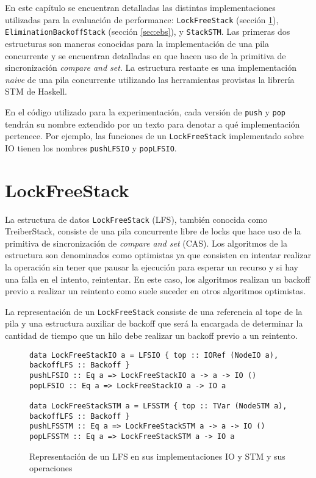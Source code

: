 En este capítulo se encuentran detalladas las distintas implementaciones utilizadas para la evaluación de performance: \texttt{LockFreeStack} (sección \ref{sec:lfs}), \texttt{EliminationBackoffStack} (sección \ref{sec:ebs}), y \texttt{StackSTM}. Las primeras dos estructuras son maneras conocidas para la implementación de una pila concurrente y se encuentran detalladas en \cite{shavit} que hacen uso de la primitiva de sincronización \emph{compare and set}. La estructura restante es una implementación \emph{naive} de una pila concurrente utilizando las herramientas provistas la librería STM de Haskell.

En el código utilizado para la experimentación, cada versión de \texttt{push} y \texttt{pop} tendrán su nombre extendido por un texto para denotar a qué implementación pertenece. Por ejemplo, las funciones de un \texttt{LockFreeStack} implementado sobre IO tienen los nombres \texttt{pushLFSIO} y \texttt{popLFSIO}.

\clearpage
\section{LockFreeStack}\label{sec:lfs}
La estructura de datos \texttt{LockFreeStack} (LFS), también conocida como TreiberStack, consiste de una pila concurrente libre de locks que hace uso de la primitiva de sincronización de \emph{compare and set} (CAS). Los algoritmos de la estructura son denominados como optimistas ya que consisten en intentar realizar la operación sin tener que pausar la ejecución para esperar un recurso y si hay una falla en el intento, reintentar. En este caso, los algoritmos realizan un backoff previo a realizar un reintento como suele suceder en otros algoritmos optimistas.

La representación de un \texttt{LockFreeStack} consiste de una referencia al tope de la pila y una estructura auxiliar de backoff que será la encargada de determinar la cantidad de tiempo que un hilo debe realizar un backoff previo a un reintento.

\begin{figure}[H]
  \centering
  \begin{verbatim}
data LockFreeStackIO a = LFSIO { top :: IORef (NodeIO a), backoffLFS :: Backoff }
pushLFSIO :: Eq a => LockFreeStackIO a -> a -> IO ()
popLFSIO :: Eq a => LockFreeStackIO a -> IO a

data LockFreeStackSTM a = LFSSTM { top :: TVar (NodeSTM a), backoffLFS :: Backoff }
pushLFSSTM :: Eq a => LockFreeStackSTM a -> a -> IO ()
popLFSSTM :: Eq a => LockFreeStackSTM a -> IO a
  \end{verbatim}
  \caption{Representación de un LFS en sus implementaciones IO y STM y sus operaciones}
  \label{repLFS}
\end{figure}

